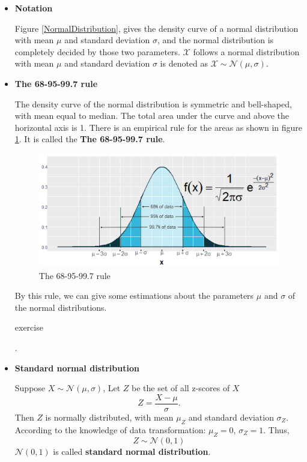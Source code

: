 \documentclass[a4paper, 12pt,twoside]{book}
\begin{document}
\begin{itemize}
\item \textbf{Notation}
\vspace{0.6cm}

Figure \ref{NormalDistribution}, gives the density curve of a normal distribution with mean $\mu$ and standard deviation $\sigma$, and the normal distribution is completely decided by those two parameters. $\mathcal{X}$ follows a normal distribution with mean $\mu$ and standard deviation $\sigma$ is denoted as $\mathcal{X}\sim \mathcal{N}(\mu, \sigma)$.
\vspace{0.6cm}

\item \textbf{The 68-95-99.7 rule}
\vspace{0.6cm}

The density curve of the normal distribution is symmetric and bell-shaped, with mean equal to median. The total area under the curve and above the horizontal axis is 1. There is an empirical rule for the areas as shown in figure \ref{68-95-99.7Rule}. It is called the \textbf{The 68-95-99.7 rule}.

\begin{figure}[H]
\centering
\includegraphics[scale=0.35]{68-95-997Rule.png}
\caption{The 68-95-99.7 rule}
\label{68-95-99.7Rule}
\end{figure}

By this rule, we can give some estimations about the parameters $\mu$ and $\sigma$ of the normal distributions. 

\colorbox{dollarbill}{\parbox{15.2cm}{exercise}}.
\vspace{0.6cm}

\item \textbf{Standard normal distribution}
\vspace{0.6cm}

Suppose $X \sim \mathcal{N}(\mu, \sigma)$, Let $Z$ be the set of all z-scores of $X$
$$Z=\frac{X - \mu}{\sigma}. $$
Then $Z$ is normally distributed, with mean $\mu_Z$ and standard deviation $\sigma_Z$. According to the knowledge of data transformation: $\mu_Z = 0$, $\sigma_Z = 1$. Thus, $$Z \sim \mathcal{N}(0, 1)$$
$\mathcal{N}(0, 1)$ is called \textbf{standard normal distribution}.
\vspace{0.6cm}



\end{itemize}
\end{document}
